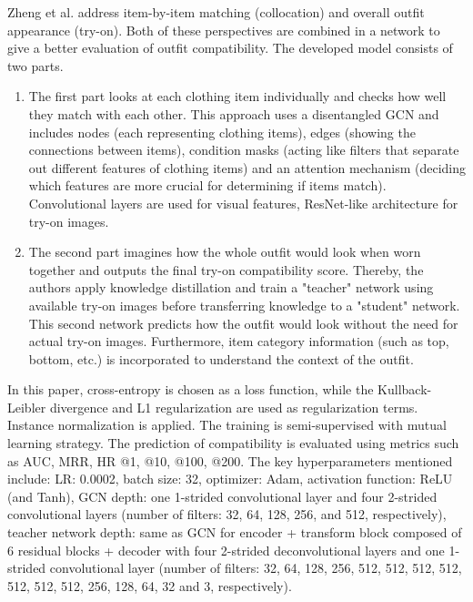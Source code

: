 \vspace{0.5cm}

Zheng et al. address item-by-item matching (collocation) and overall outfit appearance (try-on). Both of these perspectives are combined in a network to give a better evaluation of outfit compatibility. The developed model consists of two parts. \cite[cf.]{zheng_collocation_2021}

\begin{enumerate}
  \item The first part looks at each clothing item individually and checks how well they match with each other. This approach uses a disentangled \acs{GCN} and includes nodes (each representing clothing items), edges (showing the connections between items), condition masks (acting like filters that separate out different features of clothing items) and an attention mechanism (deciding which features are more crucial for determining if items match). Convolutional layers are used for visual features, \acs{ResNet}-like architecture for try-on images. 
  \item The second part imagines how the whole outfit would look when worn together and outputs the final try-on compatibility score. Thereby, the authors apply knowledge distillation and train a "teacher" network using available try-on images before transferring knowledge to a "student" network. This second network predicts how the outfit would look without the need for actual try-on images. Furthermore, item category information (such as top, bottom, etc.) is incorporated to understand the context of the outfit.
\end{enumerate}

In this paper, cross-entropy is chosen as a loss function, while the Kullback-Leibler divergence and L1 regularization are used as regularization terms. Instance normalization is applied. The training is semi-supervised with mutual learning strategy. The prediction of compatibility is evaluated using metrics such as \acs{AUC}, \acs{MRR}, \acs{HR} @1, @10, @100, @200. The key hyperparameters mentioned include: \acs{LR}: 0.0002, batch size: 32, optimizer: Adam, activation function: \acs{ReLU} (and Tanh), \acs{GCN} depth: one 1-strided convolutional layer and four 2-strided convolutional layers (number of filters: 32, 64, 128, 256, and 512, respectively), teacher network depth: same as \acs{GCN} for encoder + transform block composed of 6 residual blocks + decoder with four 2-strided deconvolutional layers and one 1-strided convolutional layer (number of filters: 32, 64, 128, 256, 512, 512, 512, 512, 512, 512, 512, 256, 128, 64, 32 and 3, respectively). \cite[cf.]{zheng_collocation_2021}

